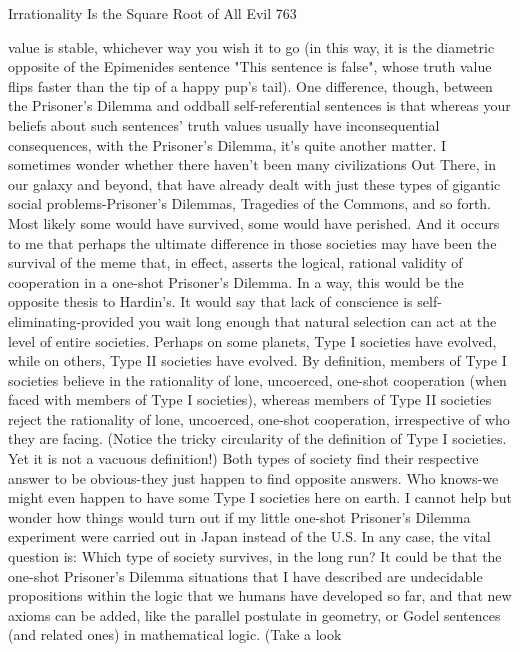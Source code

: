 Irrationality Is the Square Root of All Evil                                             763

value is stable, whichever way you wish it to go (in this way, it is the diametric
opposite of the Epimenides sentence "This sentence is false", whose truth value flips
faster than the tip of a happy pup's tail). One difference, though, between the
Prisoner's Dilemma and oddball self-referential sentences is that whereas your beliefs
about such sentences' truth values usually have inconsequential consequences, with
the Prisoner's Dilemma, it's quite another matter.
        I sometimes wonder whether there haven't been many civilizations Out There,
in our galaxy and beyond, that have already dealt with just these types of gigantic
social problems-Prisoner's Dilemmas, Tragedies of the Commons, and so forth. Most
likely some would have survived, some would have perished. And it occurs to me that
perhaps the ultimate difference in those societies may have been the survival of the
meme that, in effect, asserts the logical, rational validity of cooperation in a one-shot
Prisoner's Dilemma. In a way, this would be the opposite thesis to Hardin's. It would
say that lack of conscience is self-eliminating-provided you wait long enough that
natural selection can act at the level of entire societies.
        Perhaps on some planets, Type I societies have evolved, while on others, Type
II societies have evolved. By definition, members of Type I societies believe in the
rationality of lone, uncoerced, one-shot cooperation (when faced with members of
Type I societies), whereas members of Type II societies reject the rationality of lone,
uncoerced, one-shot cooperation, irrespective of who they are facing. (Notice the
tricky circularity of the definition of Type I societies. Yet it is not a vacuous
definition!) Both types of society find their respective answer to be obvious-they just
happen to find opposite answers. Who knows-we might even happen to have some
Type I societies here on earth. I cannot help but wonder how things would turn out if
my little one-shot Prisoner's Dilemma experiment were carried out in Japan instead of
the U.S. In any case, the vital question is: Which type of society survives, in the long
run?
        It could be that the one-shot Prisoner's Dilemma situations that I have
described are undecidable propositions within the logic that we humans have
developed so far, and that new axioms can be added, like the parallel postulate in
geometry, or Godel sentences (and related ones) in mathematical logic. (Take a look

